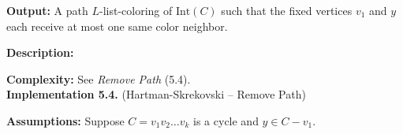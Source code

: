 \documentclass[letterpaper, 12pt]{article}
\theoremstyle{definition}
\theoremstyle{definition}
\theoremstyle{thm}
\theoremstyle{definition}
\begin{document}
\noindent\textbf{Output:} A path $L$-list-coloring of $\text{Int}(C)$ such that
the fixed vertices $v_1$ and $y$ each receive at most one same color neighbor.

\noindent\textbf{Description:}

\noindent\textbf{Complexity:} See \textit{Remove Path} (5.4).\\

\noindent\textbf{Implementation 5.4.} (Hartman-Skrekovski -- Remove Path)

\noindent\textbf{Assumptions:} Suppose $C=v_1v_2\ldots v_k$ is a cycle and
$y\in C-v_1$.



\begin{comment}
Let $G$ be a triangulated plane graph with an adjacency list representation.
For each vertex $v$ we will define the vertex property $s$ to mark which
subgraph of $G$ the vertex belongs to. Finally, the vertex property $c$ will
store the color of each vertex. We will describe an algorithm to path $3$ color
following Poh's proof \cite{poh}.

An induced path $v_1v_2\ldots v_n$ in $G$ will be represented by storing the
vertex $v_1$ and an integer $m$. Each $v_i$ will have $s[v_i]=m$. We may walk
through the path one vertex at a time, starting with $v_1$, by looking through
neighbors to find the next marked vertex.

Suppose we have two induced paths $P=p_1p_2\ldots p_k$
and $Q=q_1q_2\ldots q_l$ such that together they form the cycle
$C=p_1p_2\ldots p_kq_lq_{l-1}\ldots q_1$. Moreover, suppose all vertices in $P$
have been colored $c_1$ and all vertices in $Q$ have been colored a color $c_2$,
distinct from $c_1$.

We will color $\text{Int}(C)$ such that no vertex in $C$ receives a same
color neighbor in $\text{Int}(C)-C$. Locate $u_1$ in $a[v_1]$ by iterating
through the list. Proceeding one vertex further gives us a vertex $w$
such that $p_1q_1w$ is a triangle with no interior vertices. If $w$ is in $P$,
that is $w=p_2$, this triangle has been colored and we may apply the algorithm
to the paths $P-p_1$ and $Q$. Similarly if $w$ is in $Q$ we apply the algorithm
to $P$ and $Q-q_1$. In either case, if the two remaining paths each consist of a
single vertex then there are no remaining uncolored vertices and we terminate
the algorithm.

Otherwise, $w$ is an interior vertex. Perform a breadth first search from $w$,
not not including vertices in $C$, until we reach a vertex $w$ with neighbors
$p_i\in P$ and $q_j \in Q$ such that $p_i$ is immediately past $q_j$ in $a[z]$,
that is, $q_j$ is immediately clockwise from $p_i$. Such a vertex must exist
because $\text{Int}(C)$ is weakly triangulated and the paths $P$ and $Q$ form
the outer cycle. Backtracking from $z$ along the breadth first search and
marking vertices produces an induced $wz$-path denoted $T=t_1t_2\ldots t_r$,
with $t_1=w$ and $t_r=z$. We color this path with the third remaining color
$c_3$.


\end{comment}
\end{document}
